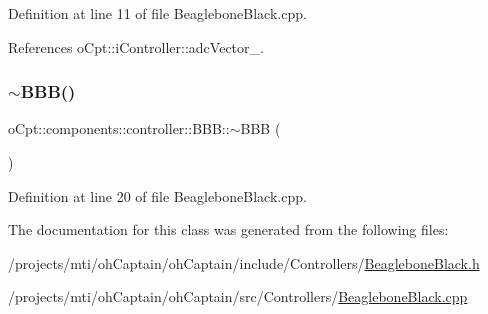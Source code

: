 Definition at line 11 of file Beaglebone\+Black.\+cpp.



References o\+Cpt\+::i\+Controller\+::adc\+Vector\+\_\+.

\hypertarget{classo_cpt_1_1components_1_1controller_1_1_b_b_b_acdf417541bfd66c55fba8a09e8cd09a1}{}\label{classo_cpt_1_1components_1_1controller_1_1_b_b_b_acdf417541bfd66c55fba8a09e8cd09a1} 
\subsubsection{\texorpdfstring{$\sim$\+B\+B\+B()}{~BBB()}}
{\footnotesize\ttfamily o\+Cpt\+::components\+::controller\+::\+B\+B\+B\+::$\sim$\+B\+BB (\begin{DoxyParamCaption}{ }\end{DoxyParamCaption})\hspace{0.3cm}{\ttfamily [virtual]}}



Definition at line 20 of file Beaglebone\+Black.\+cpp.



The documentation for this class was generated from the following files\+:\begin{DoxyCompactItemize}
\item 
/projects/mti/oh\+Captain/oh\+Captain/include/\+Controllers/\hyperlink{_beaglebone_black_8h}{Beaglebone\+Black.\+h}\item 
/projects/mti/oh\+Captain/oh\+Captain/src/\+Controllers/\hyperlink{_beaglebone_black_8cpp}{Beaglebone\+Black.\+cpp}\end{DoxyCompactItemize}
